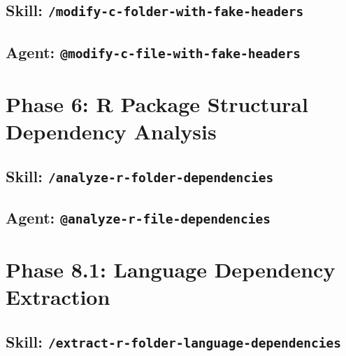\documentclass[12pt]{article}
\begin{document}
\subsection{Skill: \texttt{/modify-c-folder-with-fake-headers}}
\label{app:skill:modify-c-folder-with-fake-headers}



\subsection{Agent: \texttt{@modify-c-file-with-fake-headers}}
\label{app:agent:modify-c-file-with-fake-headers}



\section{Phase 6: R Package Structural Dependency Analysis}
\label{app:phase6}

\subsection{Skill: \texttt{/analyze-r-folder-dependencies}}
\label{app:skill:analyze-r-folder-dependencies}



\subsection{Agent: \texttt{@analyze-r-file-dependencies}}
\label{app:agent:analyze-r-file-dependencies}



\section{Phase 8.1: Language Dependency Extraction}
\label{app:phase8.1}

\subsection{Skill: \texttt{/extract-r-folder-language-dependencies}}
\label{app:skill:extract-r-folder-language-dependencies}
\end{document}
